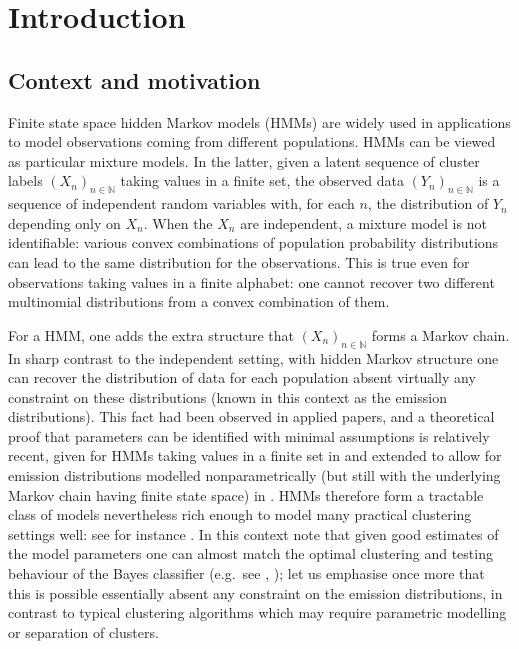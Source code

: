 \documentclass[journal]{IEEEtran}
\newcommand{\1}{\boldsymbol{1}}
\newcommand{\NN}{\mathbb{N}}
\begin{document}

	\section{Introduction}
	\label{sec:introduction}

	\subsection{Context and motivation}
	Finite state space hidden Markov models (HMMs) are widely used in applications to model observations coming from different populations. HMMs can be viewed as particular mixture models. In the latter, given a latent sequence of cluster labels $(X_n)_{n\in \NN}$ taking values in a finite set, the observed data $(Y_n)_{n\in\NN}$ is a sequence of independent random variables with, for each $n$, the distribution of $Y_n$ depending only on $X_n$. When the $X_n$ are independent, a mixture model is not identifiable: various convex combinations of population probability distributions can lead to the same distribution for the observations. This is true even for  observations taking values in a finite alphabet: one cannot recover two different multinomial distributions from a convex combination of them.

	For a HMM, one adds the extra structure that $(X_n)_{n\in\NN}$ forms a Markov chain. In sharp %
	contrast to the independent setting, with hidden Markov structure one can recover the distribution of data for each population absent virtually any constraint on these distributions (known in this context as the emission distributions). This fact had been observed in applied papers, and a theoretical proof that parameters can be identified with minimal assumptions is relatively recent, given for HMMs taking values in a finite set in \cite{MR2549554, MR2926144, AGHKT14} and extended to allow for emission distributions modelled nonparametrically (but still with the underlying Markov chain having finite state space) in \cite{MR3439359, MR3509896}. HMMs therefore form a tractable class of models nevertheless rich enough to model many practical clustering settings well: see for instance \cite{CC00, Lef03, LWM03, SC09, MR2797735, VBM13}. In this context note that given good estimates of the model parameters one can almost match the optimal clustering and testing behaviour of the Bayes classifier (e.g.\ see \cite{SunCai09}, \cite{EIK:2021}); let us emphasise once more that this is possible essentially absent any constraint on the emission distributions, in contrast to typical clustering algorithms which may require parametric modelling or separation of clusters.
\end{document}
